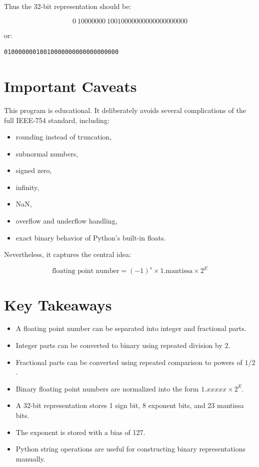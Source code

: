 \documentclass[11pt]{article}
\begin{document}
Thus the 32-bit representation should be:

\[
0\ 10000000\ 10010000000000000000000
\]

or:

\begin{lstlisting}
01000000010010000000000000000000
\end{lstlisting}

\section{Important Caveats}

This program is educational. It deliberately avoids several complications of the full IEEE-754 standard, including:

\begin{itemize}
    \item rounding instead of truncation,
    \item subnormal numbers,
    \item signed zero,
    \item infinity,
    \item NaN,
    \item overflow and underflow handling,
    \item exact binary behavior of Python's built-in floats.
\end{itemize}

Nevertheless, it captures the central idea:

\[
\text{floating point number}
=
(-1)^s \times 1.\text{mantissa} \times 2^E
\]

\section{Key Takeaways}

\begin{itemize}
    \item A floating point number can be separated into integer and fractional parts.
    \item Integer parts can be converted to binary using repeated division by 2.
    \item Fractional parts can be converted using repeated comparison to powers of $1/2$.
    \item Binary floating point numbers are normalized into the form $1.xxxxx \times 2^E$.
    \item A 32-bit representation stores 1 sign bit, 8 exponent bits, and 23 mantissa bits.
    \item The exponent is stored with a bias of 127.
    \item Python string operations are useful for constructing binary representations manually.
\end{itemize}
\end{document}
